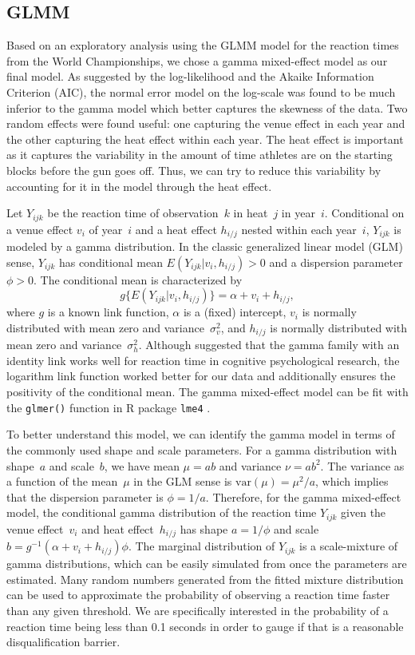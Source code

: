 \documentclass[12pt, letterpaper, titlepage]{article}
\begin{document}
\subsection{GLMM}\label{sec:glmm}
Based on an exploratory analysis using the GLMM model for the reaction times
from the World Championships, we chose a gamma mixed-effect model as our 
final model. As suggested by the log-likelihood and the Akaike Information
Criterion (AIC), the normal error model on the log-scale was found to be
much inferior to the gamma model which better captures the skewness of the
data. Two random effects were found useful: one capturing the venue effect in
each year and the other capturing the heat effect within each year. The heat
effect is important as it captures the variability in the amount of time
athletes are on the starting blocks before the gun goes off. Thus, we can try
to reduce this variability by accounting for it in the model through the heat
effect.


Let $Y_{ijk}$ be the reaction time of observation~$k$ in heat~$j$ in year~$i$.
Conditional on a venue effect $v_i$ of year~$i$ and a heat effect
$h_{i/j}$ nested within each year~$i$, $Y_{ijk}$ is modeled by a
gamma distribution. In the classic generalized linear model (GLM) sense,
$Y_{ijk}$ has conditional mean $E(Y_{ijk} | v_i, h_{i/j}) > 0$ and a
dispersion parameter~$\phi > 0$. The conditional mean is characterized by
\[
g\{E(Y_{ijk} | v_i, h_{i/j})\} = \alpha + v_i + h_{i/j},
\]
where $g$ is a known link function, $\alpha$ is a (fixed) intercept,
$v_i$ is normally distributed with mean zero and
variance~$\sigma_v^2$, and $h_{i/j}$ 
is normally distributed with mean
zero and variance~$\sigma_h^2$.
Although \citet{lo2015idlink} suggested that the gamma 
family with an identity link works well for reaction time in cognitive
psychological research, the logarithm
link function worked better for our data and additionally ensures the positivity
of the conditional mean. The gamma mixed-effect model can be fit with the 
\texttt{glmer()} function in R package \texttt{lme4} \citep{lme4}.


To better understand this model, we can identify the gamma model in terms of the
commonly used shape and scale parameters. For a gamma distribution with
shape~$a$ and scale~$b$, we have mean $\mu = ab$ and variance $\nu = ab^2$. The
variance as a function of the mean~$\mu$ in the GLM sense is
$\text{var}(\mu) = \mu^2 / a$, which implies that the dispersion parameter is
$\phi = 1 / a$. Therefore, for the gamma mixed-effect model, the conditional
gamma distribution of the reaction time $Y_{ijk}$ given the venue
effect~$v_i$ and heat effect~$h_{i/j}$
has shape $a = 1 / \phi$ and scale
$b = g^{-1}(\alpha + v_i + h_{i/j}) \phi$. The marginal
distribution of $Y_{ijk}$ is a scale-mixture of gamma distributions, which can be
easily simulated from once the parameters are estimated. Many
random numbers generated from the fitted mixture distribution can be used to
approximate the probability of observing a reaction time faster than any given
threshold. We are specifically interested in the probability of a reaction time
being less than 0.1 seconds in order to gauge if that is a reasonable 
disqualification barrier.
\end{document}
